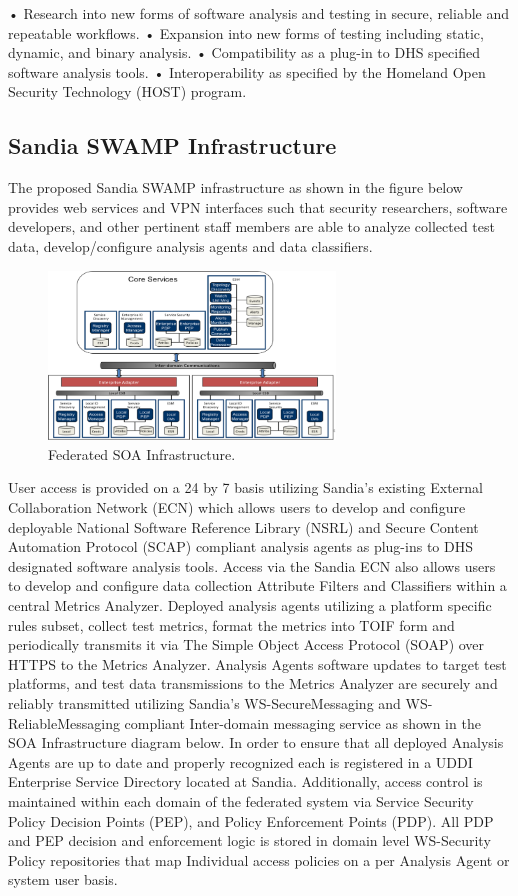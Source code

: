 \documentclass[times, 10pt,twocolumn]{article}
\begin{document}
•	Research into new forms of software analysis and testing in secure, reliable and repeatable workflows.
•	Expansion into new forms of testing including static, dynamic, and binary analysis.
•	Compatibility as a plug-in to DHS specified software analysis tools.
•	Interoperability as specified by the Homeland Open Security Technology (HOST) program.        

\subsection{Sandia SWAMP Infrastructure}\label{sec:tech:infra}
The proposed Sandia SWAMP infrastructure as shown in the figure below provides web services and VPN interfaces such that security researchers, software developers, and other pertinent staff members are able to analyze collected test data, develop/configure analysis agents and data classifiers.       

\begin{figure}[!t]
\centering
\includegraphics[width=3in]{image005}
\caption{Federated SOA Infrastructure.}
\label{fig:soa-infra}
\end{figure}  

User access is provided on a 24 by 7 basis utilizing Sandia’s existing External Collaboration Network (ECN) which allows users to develop and configure deployable National Software Reference Library (NSRL) and Secure Content Automation Protocol (SCAP) compliant analysis agents as plug-ins to DHS designated software analysis tools. Access via the Sandia ECN also allows users to develop and configure data collection Attribute Filters and Classifiers within a central Metrics Analyzer. Deployed analysis agents utilizing a platform specific rules subset, collect test metrics, format the metrics into TOIF form and periodically transmits it via The Simple Object Access Protocol (SOAP) over HTTPS to the Metrics Analyzer. Analysis Agents software updates to target test platforms, and test data transmissions to the Metrics Analyzer are securely and reliably transmitted utilizing Sandia’s WS-SecureMessaging and WS-ReliableMessaging compliant Inter-domain messaging service as shown in the SOA Infrastructure diagram below. In order to ensure that all deployed Analysis Agents are up to date and properly recognized each is registered in a UDDI Enterprise Service Directory located at Sandia. Additionally, access control is maintained within each domain of the federated system via Service Security Policy Decision Points (PEP), and Policy Enforcement Points (PDP). All PDP and PEP decision and enforcement logic is stored in domain level WS-Security Policy repositories that map Individual access policies on a per Analysis Agent or system user basis.   
\end{document}
